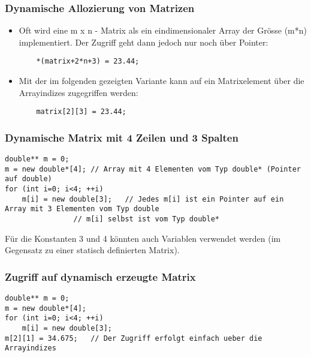 \subsubsection{Dynamische Allozierung von Matrizen\hfill}
\label{sec:unterunterabschnitt}
\begin{itemize}
	\item Oft wird eine m x n - Matrix als ein eindimensionaler Array der Grösse (m*n) implementiert. Der Zugriff geht dann jedoch nur noch über Pointer:
	\noindent
	\begin{minipage}{\linewidth}
	\begin{lstlisting}
	*(matrix+2*n+3) = 23.44;
	\end{lstlisting}
	\end{minipage}
	\item Mit der im folgenden gezeigten Variante kann auf ein Matrixelement über die Arrayindizes zugegriffen werden:
	\begin{minipage}{\linewidth}
	\begin{lstlisting}
	matrix[2][3] = 23.44;
	\end{lstlisting}
	\end{minipage}
\end{itemize}

\subsubsection{Dynamische Matrix mit 4 Zeilen und 3 Spalten\hfill}
\label{sec:unterunterabschnitt}
\noindent
\begin{minipage}{\linewidth}
\begin{lstlisting}
double** m = 0;
m = new double*[4];	// Array mit 4 Elementen vom Typ double* (Pointer auf double)
for (int i=0; i<4; ++i)	
	m[i] = new double[3];	// Jedes m[i] ist ein Pointer auf ein Array mit 3 Elementen vom Typ double
				// m[i] selbst ist vom Typ double*		
\end{lstlisting}
\end{minipage}
Für die Konstanten 3 und 4 könnten auch Variablen verwendet werden (im Gegensatz zu einer statisch definierten Matrix).


\subsubsection{Zugriff auf dynamisch erzeugte Matrix\hfill}
\label{sec:unterunterabschnitt}
\noindent
\begin{minipage}{\linewidth}
\begin{lstlisting}
double** m = 0;
m = new double*[4];
for (int i=0; i<4; ++i)	
	m[i] = new double[3];	
m[2][1] = 34.675;	// Der Zugriff erfolgt einfach ueber die Arrayindizes	
\end{lstlisting}
\end{minipage}

